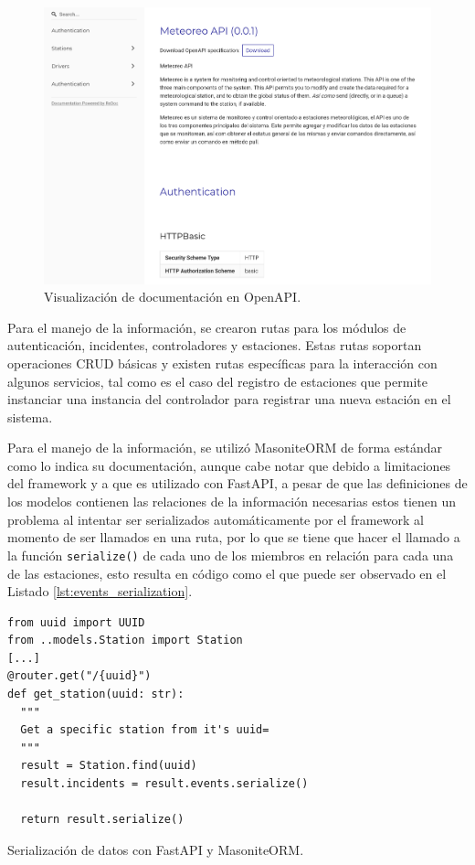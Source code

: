 \begin{figure}[!ht]
	\centering
	\includegraphics[width=1\linewidth]{images/screenshots/ReDoc_api_docs.png}
	\caption{Visualización de documentación en OpenAPI.}
	\label{fig:openapi_redoc}
\end{figure}

Para el manejo de la información, se crearon rutas para los módulos de autenticación, incidentes, controladores y estaciones. Estas rutas soportan operaciones CRUD básicas y existen rutas específicas para la interacción con algunos servicios, tal como es el caso del registro de estaciones que permite instanciar una instancia del controlador para registrar una nueva estación en el sistema.

Para el manejo de la información, se utilizó MasoniteORM de forma estándar como lo indica su documentación, aunque cabe notar que debido a limitaciones del framework y a que es utilizado con FastAPI, a pesar de que las definiciones de los modelos contienen las relaciones de la información necesarias estos tienen un problema al intentar ser serializados automáticamente por el framework al momento de ser llamados en una ruta, por lo que se tiene que hacer el llamado a la función \texttt{serialize()} de cada uno de los miembros en relación para cada una de las estaciones, esto resulta en código como el que puede ser observado en el Listado \ref{lst:events_serialization}.

\begin{listing}
\begin{verbatim}
from uuid import UUID
from ..models.Station import Station
[...]
@router.get("/{uuid}")
def get_station(uuid: str):
  """
  Get a specific station from it's uuid=
  """
  result = Station.find(uuid)
  result.incidents = result.events.serialize()

  return result.serialize()
\end{verbatim}
\caption{Serialización de datos con FastAPI y MasoniteORM.}
\label{lst:events_serialization}
\end{listing}

